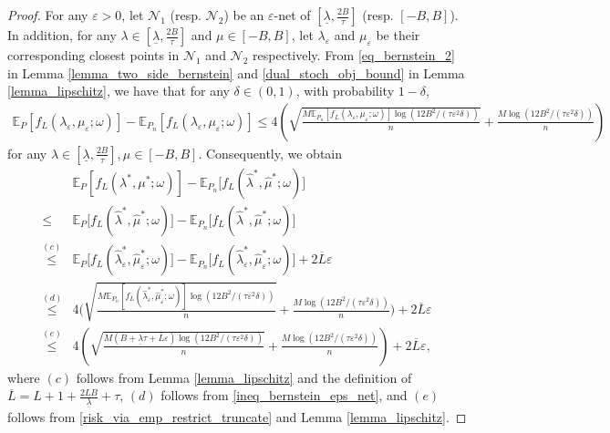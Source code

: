 \documentclass[10pt,a4paper]{amsart}
\newcommand{\EE}{\mathbb{E}}
\newcommand{\cN}{\mathcal{N}}
\renewcommand{\frac}[2]{\tfrac{#1}{#2}}
\newcommand{\rbr}[1]{\left(#1\right)}
\newcommand{\sbr}[1]{\left[#1\right]}
\begin{document}
\begin{proof}
For any $\varepsilon > 0$, let $\cN_1$ (resp. $\cN_2$) be an $\varepsilon$-net of $[\underline{\lambda}, \frac{2B}{\tau}]$ (resp. $[-B, B]$). 
In addition, for any $\lambda \in  [\underline{\lambda}, \frac{2B}{\tau}]$ and $\mu \in [-B, B]$, let 
$\lambda_\varepsilon$ and $\mu_\varepsilon$ be their corresponding closest points in $\cN_1$ and $\cN_2$ respectively. 
From \eqref{eq_bernstein_2} in Lemma \ref{lemma_two_side_bernstein} and \eqref{dual_stoch_obj_bound} in Lemma \ref{lemma_lipschitz}, we have that for any $\delta \in (0,1)$, with probability $1-\delta$,
\begin{align}\label{ineq_bernstein_eps_net}
{
\EE_{P} \sbr{f_L (\lambda_\varepsilon, \mu_\varepsilon; \omega)}  - \EE_{P_n} \sbr{f_L (\lambda_\varepsilon, \mu_\varepsilon; \omega)}
}
\leq 
 4 \rbr{
\sqrt{\frac{ M  {\EE_{P_n} \sbr{f_L (\lambda_\varepsilon, \mu_\varepsilon; \omega) }
} \log(12B^2/(\tau \varepsilon^2 \delta))}{n}} + \frac{ M \log(12B^2/(\tau \varepsilon^2 \delta))}{n} 
}
\end{align}
for any $ \lambda \in [\underline{\lambda}, \frac{2B}{\tau}], \mu \in [-B, B]$.
Consequently, we obtain
\begin{align}
&  \EE_{P} \sbr{f_L (\lambda^*, \mu^*; \omega)}
- 
\EE_{P_n} \big[{f_L (\hat{\lambda}^*, \hat{\mu}^*; \omega)} \big] \nonumber \\ 
 \leq &   \EE_{P} \big[{f_L (\hat \lambda^*, \hat \mu^*; \omega)} \big] 
-  \EE_{P_n} \big[{f_L (\hat{\lambda}^*, \hat{\mu}^*; \omega)} \big]  \nonumber  \\
 \overset{(c)}{\leq} &   \EE_{P} \big[{f_L (\hat{\lambda}^*_\varepsilon, \hat{\mu}^*_\varepsilon; \omega)}\big] 
-  \EE_{P_n} \big[{f_L (\hat{\lambda}^*_\varepsilon, \hat{\mu}^*_\varepsilon; \omega)} \big] + 2 \overline{L} \varepsilon \nonumber \\
 \overset{(d)}{\leq}  &  
 4 \bigg({
\sqrt{\frac{ M  {\EE_{P_n} \sbr{f_L (\hat \lambda^*_\varepsilon, \hat \mu^*_\varepsilon; \omega) }
} \log(12B^2/(\tau \varepsilon^2 \delta))}{n}} + \frac{ M \log(12B^2/(\tau \varepsilon^2 \delta))}{n} 
} \bigg) + 2 \overline{L} \varepsilon \nonumber  \\
 \overset{(e)}{\leq}  &   
  4 \rbr{
\sqrt{\frac{ M 
(B + \underline{\lambda} \tau + \overline{L} \varepsilon)
 \log(12B^2/(\tau \varepsilon^2 \delta))}{n}} + \frac{ M \log(12B^2/(\tau \varepsilon^2 \delta))}{n} 
}  + 2 \overline{L} \varepsilon, 
\label{pop_emp_min_loss_diff_1}
\end{align}
where 
$(c)$ follows from Lemma \ref{lemma_lipschitz} and the definition of $\overline{L} =  {L+1 +  \frac{2LB}{\underline{\lambda}} + \tau}$, $(d)$ follows from \eqref{ineq_bernstein_eps_net}, and $(e)$ follows from \eqref{risk_via_emp_restrict_truncate} and Lemma \ref{lemma_lipschitz}.


\end{proof}
\end{document}
